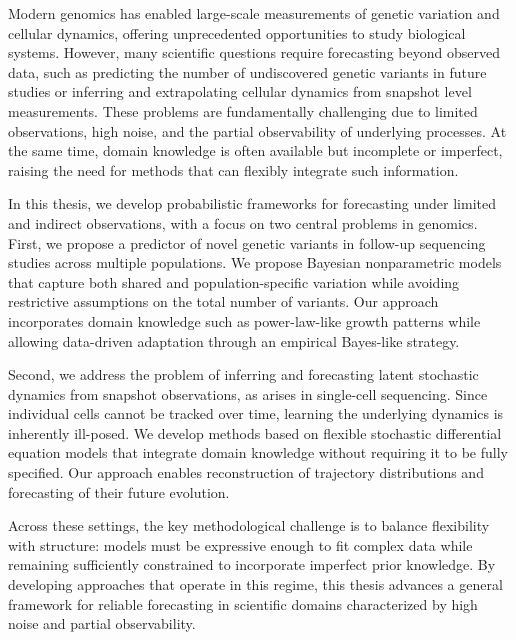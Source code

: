 Modern genomics has enabled large-scale measurements of genetic variation and cellular dynamics, offering unprecedented opportunities to study biological systems. However, many scientific questions require forecasting beyond observed data, such as predicting the number of undiscovered genetic variants in future studies or inferring and extrapolating cellular dynamics from snapshot level measurements. These problems are fundamentally challenging due to limited observations, high noise, and the partial observability of underlying processes. At the same time, domain knowledge is often available but incomplete or imperfect, raising the need for methods that can flexibly integrate such information.

In this thesis, we develop probabilistic frameworks for forecasting under limited and indirect observations, with a focus on two central problems in genomics. First, we propose a predictor of novel genetic variants in follow-up sequencing studies across multiple populations. We propose Bayesian nonparametric models that capture both shared and population-specific variation while avoiding restrictive assumptions on the total number of variants. Our approach incorporates domain knowledge such as power-law-like growth patterns while allowing data-driven adaptation through an empirical Bayes-like strategy.

Second, we address the problem of inferring and forecasting latent stochastic dynamics from snapshot observations, as arises in single-cell sequencing. Since individual cells cannot be tracked over time, learning the underlying dynamics is inherently ill-posed. We develop methods based on flexible stochastic differential equation models that integrate domain knowledge without requiring it to be fully specified. Our approach enables reconstruction of trajectory distributions and forecasting of their future evolution.

Across these settings, the key methodological challenge is to balance flexibility with structure: models must be expressive enough to fit complex data while remaining sufficiently constrained to incorporate imperfect prior knowledge. By developing approaches that operate in this regime, this thesis advances a general framework for reliable forecasting in scientific domains characterized by high noise and partial observability.